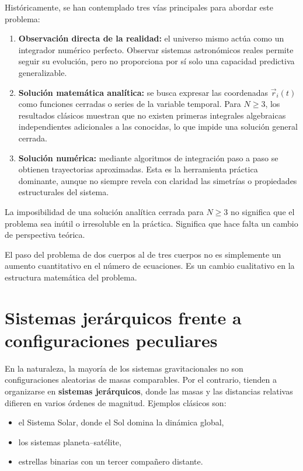 Históricamente, se han contemplado tres vías principales para abordar este problema:
\begin{enumerate}
    \item \textbf{Observación directa de la realidad:} el universo mismo actúa como un integrador numérico perfecto. Observar sistemas astronómicos reales permite seguir su evolución, pero no proporciona por sí solo una capacidad predictiva generalizable.
    \item \textbf{Solución matemática analítica:} se busca expresar las coordenadas \(\vec{r}_i(t)\) como funciones cerradas o series de la variable temporal. Para \(N \ge 3\), los resultados clásicos muestran que no existen primeras integrales algebraicas independientes adicionales a las conocidas, lo que impide una solución general cerrada.
    \item \textbf{Solución numérica:} mediante algoritmos de integración paso a paso se obtienen trayectorias aproximadas. Esta es la herramienta práctica dominante, aunque no siempre revela con claridad las simetrías o propiedades estructurales del sistema.
\end{enumerate}

La imposibilidad de una solución analítica cerrada para \(N \ge 3\) no significa que el problema sea inútil o irresoluble en la práctica. Significa que hace falta un cambio de perspectiva teórica.

\begin{importante}
El paso del problema de dos cuerpos al de tres cuerpos no es simplemente un aumento cuantitativo en el número de ecuaciones. Es un cambio cualitativo en la estructura matemática del problema.
\end{importante}

\section{Sistemas jerárquicos frente a configuraciones peculiares}
En la naturaleza, la mayoría de los sistemas gravitacionales no son configuraciones aleatorias de masas comparables. Por el contrario, tienden a organizarse en \textbf{sistemas jerárquicos}, donde las masas y las distancias relativas difieren en varios órdenes de magnitud. Ejemplos clásicos son:
\begin{itemize}
    \item el Sistema Solar, donde el Sol domina la dinámica global,
    \item los sistemas planeta--satélite,
    \item estrellas binarias con un tercer compañero distante.
\end{itemize}

